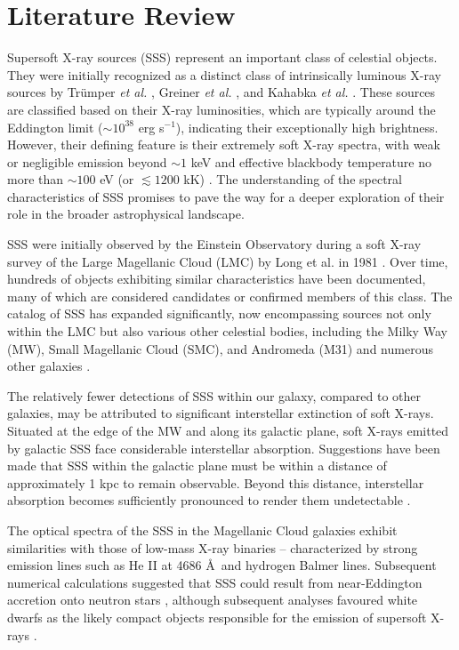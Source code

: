     \newpage
    \section{Literature Review} \label{multi-obs:lit-rev}
    	Supersoft X-ray sources (SSS) represent an important class of celestial objects. They were initially recognized as a distinct class of intrinsically luminous X-ray sources by Trümper \textit{et al.} \cite{trumper1991x}, Greiner \textit{et al.} \cite{greiner1991rosat}, and Kahabka \textit{et al.} \cite{kahabka97}. These sources are classified based on their X-ray luminosities, which are typically around the Eddington limit ($\sim 10^{38}$ erg s$^{-1}$), indicating their exceptionally high brightness. However, their defining feature is their extremely soft X-ray spectra, with weak or negligible emission beyond $\sim 1$ keV and effective blackbody temperature no more than $\sim 100$ eV (or $\lesssim 1200$ kK) \cite{kahabka06}. The understanding of the spectral characteristics of SSS promises to pave the way for a deeper exploration of their role in the broader astrophysical landscape.
    	
    	SSS were initially observed by the Einstein Observatory during a soft X-ray survey of the Large Magellanic Cloud (LMC) by Long et al. in 1981 \cite{long81}. Over time, hundreds of objects exhibiting similar characteristics have been documented, many of which are considered candidates or confirmed members of this class. The catalog of SSS has expanded significantly, now encompassing sources not only within the LMC but also various other celestial bodies, including the Milky Way (MW), Small Magellanic Cloud (SMC), and Andromeda (M31) and numerous other galaxies \cite{kahabkatrumper1996,steinerdiaz1998,greiner2000,pietsch2003deep,di2003luminous,orio2010census,henze2010recent,sturm2012new,galiullin2021populations}.
    	
    	The relatively fewer detections of SSS within our galaxy, compared to other galaxies, may be attributed to significant interstellar extinction of soft X-rays. Situated at the edge of the MW and along its galactic plane, soft X-rays emitted by galactic SSS face considerable interstellar absorption. Suggestions have been made that SSS within the galactic plane must be within a distance of approximately 1 kpc to remain observable. Beyond this distance, interstellar absorption becomes sufficiently pronounced to render them undetectable \cite{van1992accreting}.
    	
    	The optical spectra of the SSS in the Magellanic Cloud galaxies exhibit similarities with those of low-mass X-ray binaries -- characterized by strong emission lines such as He II at 4686 \AA\ and hydrogen Balmer lines. Subsequent numerical calculations suggested that SSS could result from near-Eddington accretion onto neutron stars \cite{kylafis93}, although subsequent analyses favoured white dwarfs as the likely compact objects responsible for the emission of supersoft X-rays \cite{vandenHeuvel92}.
    	
